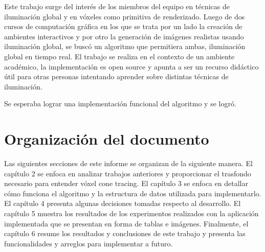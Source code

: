 Este trabajo surge del interés de los miembros del equipo en técnicas de iluminación global y en vóxeles como primitiva de renderizado.
Luego de dos cursos de computación gráfica en los que se trata por un lado la creación de ambientes interactivos y por otro la generación de imágenes realistas usando iluminación global, se buscó un algoritmo que permitiera ambas, iluminación global en tiempo real.
El trabajo se realiza en el contexto de un ambiente académico, la implementación es open source y apunta a ser un recurso didáctico útil para otras personas intentando aprender sobre distintas técnicas de iluminación.

Se esperaba lograr una implementación funcional del algoritmo y se logró.

\section{Organización del documento}

Las siguientes secciones de este informe se organizan de la siguiente manera.
El capítulo 2 se enfoca en analizar trabajos anteriores y proporcionar el trasfondo necesario para entender vóxel cone tracing.
El capítulo 3 se enfoca en detallar cómo funciona el algoritmo y la estructura de datos utilizada para implementarlo.
El capítulo 4 presenta algunas decisiones tomadas respecto al desarrollo.
El capítulo 5 muestra los resultados de los experimentos realizados con la aplicación implementada que se presentan en forma de tablas e imágenes.
Finalmente, el capítulo 6 resume los resultados y conclusiones de este trabajo y presenta las funcionalidades y arreglos para implementar a futuro.
